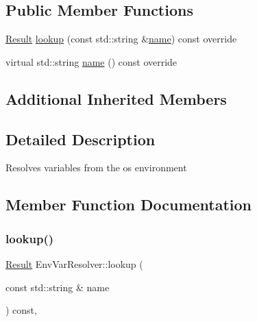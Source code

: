 \subsection*{Public Member Functions}
\begin{DoxyCompactItemize}
\item 
\hyperlink{classtheoria_1_1config_1_1ConfigVariableResolver_af27a85262d802c9ad4ecb1179efaf447}{Result} \hyperlink{classtheoria_1_1config_1_1EnvVarResolver_abe8584760283bca6c2ebda1116c8159b}{lookup} (const std\+::string \&\hyperlink{classtheoria_1_1config_1_1EnvVarResolver_ab2c250e1b7866dcd618dc90f3c3eab19}{name}) const override
\item 
virtual std\+::string \hyperlink{classtheoria_1_1config_1_1EnvVarResolver_ab2c250e1b7866dcd618dc90f3c3eab19}{name} () const override
\end{DoxyCompactItemize}
\subsection*{Additional Inherited Members}


\subsection{Detailed Description}
Resolves variables from the os environment 

\subsection{Member Function Documentation}
\mbox{\label{classtheoria_1_1config_1_1EnvVarResolver_abe8584760283bca6c2ebda1116c8159b}} 
\subsubsection{\texorpdfstring{lookup()}{lookup()}}
{\footnotesize\ttfamily \hyperlink{classtheoria_1_1config_1_1ConfigVariableResolver_af27a85262d802c9ad4ecb1179efaf447}{Result} Env\+Var\+Resolver\+::lookup (\begin{DoxyParamCaption}\item[{const std\+::string \&}]{name }\end{DoxyParamCaption}) const\hspace{0.3cm}{\ttfamily [override]}, {\ttfamily [virtual]}}


